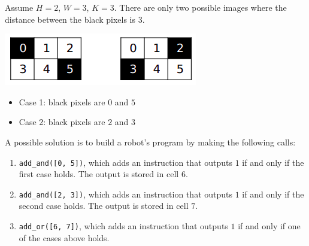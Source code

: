 Assume $H=2$, $W=3$, $K=3$. There are only two possible images where the distance between the black pixels is $3$.

\includegraphics{1.png}

\begin{itemize}
\item Case 1: black pixels are $0$ and $5$
\item Case 2: black pixels are $2$ and $3$
\end{itemize}

A possible solution is to build a robot's program by making the following calls:
\begin{enumerate}
\item \texttt{add\_and([0, 5])}, which adds an instruction that outputs $1$ if and only if the first case holds. The output is stored in cell $6$.
\item \texttt{add\_and([2, 3])}, which adds an instruction that outputs $1$ if and only if the second case holds. The output is stored in cell $7$.
\item \texttt{add\_or([6, 7])}, which adds an instruction that outputs $1$ if and only if one of the cases above holds.
\end{enumerate}
